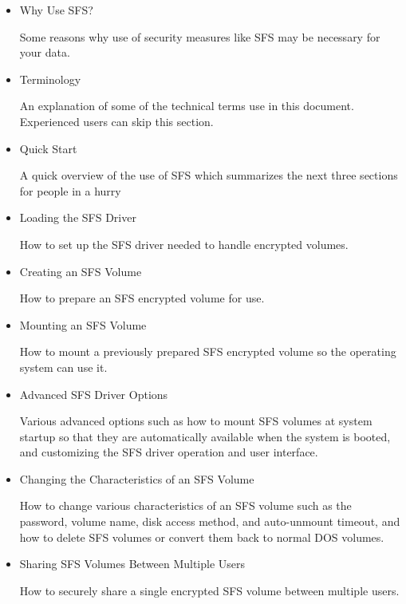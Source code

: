 \begin{itemize}

\item Why Use SFS?

        Some reasons why use of security measures like SFS may be
        necessary for your data.

\item Terminology

        An explanation of some of the technical terms use in this
        document.  Experienced users can skip this section.

\item Quick Start

        A quick overview of the use of SFS which summarizes the
        next three sections for people in a hurry

\item Loading the SFS Driver

        How to set up the SFS driver needed to handle encrypted
        volumes.

\item Creating an SFS Volume

        How to prepare an SFS encrypted volume for use.

\item Mounting an SFS Volume

        How to mount a previously prepared SFS encrypted volume
        so the operating system can use it.

\item Advanced SFS Driver Options

        Various advanced options such as how to mount SFS volumes
        at system startup so that they are automatically available when
        the system is booted, and customizing the SFS driver operation
        and user interface.

\item Changing the Characteristics of an SFS Volume

        How to change various characteristics of an SFS volume such
        as the password, volume name, disk access method, and 
        auto-unmount timeout, and how to delete SFS volumes or convert 
        them back to normal DOS volumes.

\item Sharing SFS Volumes Between Multiple Users

        How to securely share a single encrypted SFS volume between
        multiple users.


\end{itemize}
